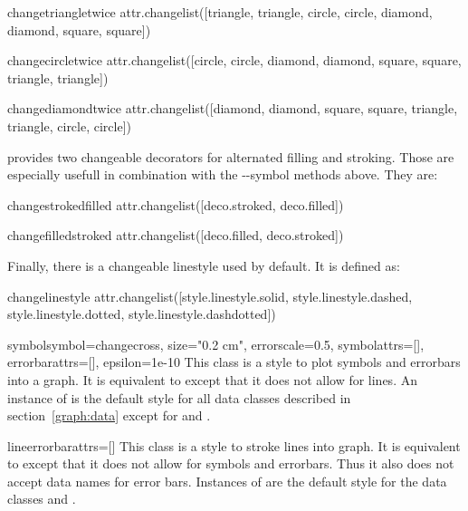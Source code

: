 \begin{memberdesc}{changetriangletwice}
  attr.changelist([triangle, triangle, circle, circle, diamond, diamond, square, square])
\end{memberdesc}

\begin{memberdesc}{changecircletwice}
  attr.changelist([circle, circle, diamond, diamond, square, square, triangle, triangle])
\end{memberdesc}

\begin{memberdesc}{changediamondtwice}
  attr.changelist([diamond, diamond, square, square, triangle, triangle, circle, circle])
\end{memberdesc}

 provides two changeable decorators for alternated filling
and stroking. Those are especially usefull in combination with the
--symbol methods above. They are:

\begin{memberdesc}{changestrokedfilled}
  attr.changelist([deco.stroked, deco.filled])
\end{memberdesc}

\begin{memberdesc}{changefilledstroked}
  attr.changelist([deco.filled, deco.stroked])
\end{memberdesc}

Finally, there is a changeable linestyle used by default. It is
defined as:

\begin{memberdesc}{changelinestyle}
  attr.changelist([style.linestyle.solid, style.linestyle.dashed, style.linestyle.dotted, style.linestyle.dashdotted])
\end{memberdesc}

\begin{classdesc}{symbol}{symbol=changecross, size="0.2 cm",
                          errorscale=0.5, symbolattrs=[],
                          errorbarattrs=[], epsilon=1e-10}
  This class is a style to plot symbols and errorbars into a graph. It
  is equivalent to  except that it does not allow
  for lines. An instance of  is the default style for
  all data classes described in section~\ref{graph:data} except for
   and .
\end{classdesc}

\begin{classdesc}{line}{errorbarattrs=[]}
  This class is a style to stroke lines into graph. It is equivalent
  to  except that it does not allow for symbols and
  errorbars. Thus it also does not accept data names for error bars.
  Instances of  are the default style for the data classes
   and .
\end{classdesc}

